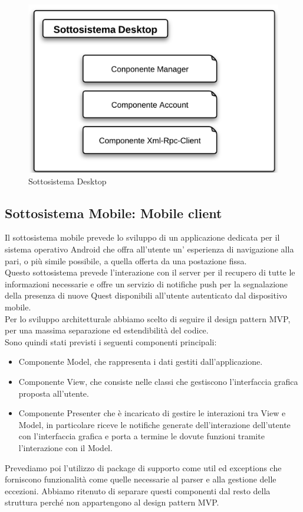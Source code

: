 \begin{figure}[H]
\centering
\includegraphics[scale=0.7]{images/cap2/Desktop/sottosistemaDesktop.png} %
\caption{Sottosistema Desktop}
\label{Sottosistema Desktop}
\end{figure}



\subsection{Sottosistema Mobile: Mobile client}
Il sottosistema mobile prevede lo sviluppo di un applicazione dedicata per il sistema operativo Android che offra all'utente un' esperienza di navigazione alla pari, o più simile possibile, a quella offerta da una postazione fissa.\\
Questo sottosistema prevede l'interazione con il server per il recupero di tutte le informazioni necessarie e offre un servizio di notifiche push per la segnalazione della presenza di nuove Quest disponibili all'utente autenticato dal dispositivo mobile.\\
Per lo sviluppo architetturale abbiamo scelto di seguire il design pattern MVP, per una massima separazione ed estendibilità del codice.\\
Sono quindi stati previsti i seguenti componenti principali:
\begin{itemize}
\item Componente Model, che rappresenta i dati gestiti dall'applicazione.
\item Componente View, che consiste nelle classi che gestiscono l'interfaccia grafica proposta all'utente.
\item Componente Presenter che è incaricato di gestire le interazioni tra View e Model, in particolare riceve le notifiche generate dell'interazione dell'utente con l'interfaccia grafica e porta a termine le dovute funzioni tramite l'interazione con il Model.
\end{itemize}
Prevediamo poi l'utilizzo di package di supporto come util ed exceptions che forniscono funzionalità come quelle necessarie al parser e alla gestione delle eccezioni. Abbiamo ritenuto di separare questi componenti dal resto della struttura perché non appartengono al design pattern MVP.

